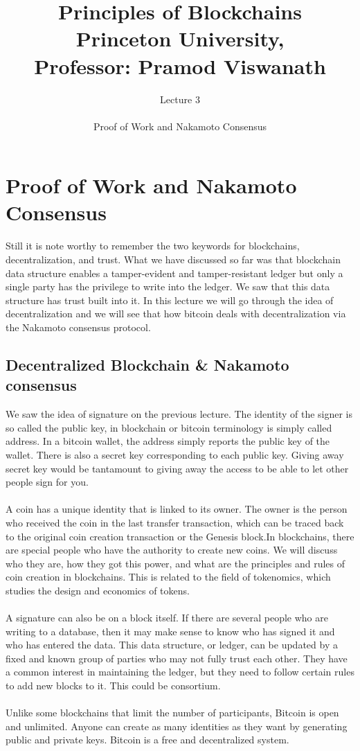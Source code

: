 \documentclass{report}
\title{\Huge{Principles of Blockchains \\ Princeton University,\\
		Professor: Pramod Viswanath}}
\author{\huge{Lecture 3} \\\\ Proof of Work and Nakamoto Consensus}
\begin{document}
\maketitle
\newpage%
\tableofcontents
\pagebreak

\chapter{Proof of Work and Nakamoto Consensus}
Still it is note worthy to remember the two keywords for blockchains, decentralization, and trust. What we have discussed so far was that blockchain data structure enables a tamper-evident and tamper-resistant ledger but only a single party has the privilege to write into the ledger. We saw that this data structure has trust built into it. In this lecture we will go through the idea of decentralization and we will see that how bitcoin deals with decentralization via the Nakamoto consensus protocol.

\section{Decentralized Blockchain \& Nakamoto consensus}
We saw the idea of signature on the previous lecture. The identity of the signer is so called the public key, in blockchain or bitcoin terminology is simply called address. In a bitcoin wallet, the address simply reports the public key of the wallet. There is also a secret key corresponding to each public key. Giving away secret key would be tantamount to giving away the access to be able to let other people sign for you.\\\\
A coin has a unique identity that is linked to its owner. The owner is the person who received the coin in the last transfer transaction, which can be traced back to the original coin creation transaction or the Genesis block.In blockchains, there are special people who have the authority to create new coins. We will discuss who they are, how they got this power, and what are the principles and rules of coin creation in blockchains. This is related to the field of tokenomics, which studies the design and economics of tokens.\\\\
A signature can also be on a block itself.  If there are several people who are writing to a database, then it may make sense to know who has signed it and who has entered the data. This data structure, or ledger, can be updated by a fixed and known group of parties who may not fully trust each other. They have a common interest in maintaining the ledger, but they need to follow certain rules to add new blocks to it. This could be consortium. \\\\
Unlike some blockchains that limit the number of participants, Bitcoin is open and unlimited. Anyone can create as many identities as they want by generating public and private keys. Bitcoin is a free and decentralized system.
\end{document}
